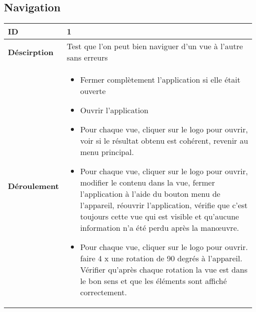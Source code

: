 	\subsection{Navigation}
				 \begin{longtable}{m{4cm}|p{10cm}|}
				 \textbf{ ID} & 1 \\
				 \hline \textbf{Déscirption} & Test que l'on peut bien naviguer d'un vue à l'autre sans erreurs\\
				 \hline \textbf{Déroulement} &
					 \begin{itemize}
						 \item Fermer complètement l'application si elle était ouverte
						 \item Ouvrir l'application
						 \item  Pour chaque vue, cliquer sur le logo pour ouvrir, voir si le résultat obtenu est cohérent, revenir au menu principal.
						 \item  Pour chaque vue, cliquer sur le logo pour ouvrir, modifier le contenu dans la vue, fermer l'application à l'aide du bouton menu de l'appareil, réouvrir l'application, vérifie que c'est toujours cette vue qui est visible et qu'aucune information n'a été perdu après la manœuvre. 
						 \item  Pour chaque vue, cliquer sur le logo pour ouvrir. faire 4 x une rotation de 90 degrés à l'appareil. Vérifier qu'après chaque rotation la vue est dans le bon sens et que les éléments sont affiché correctement. 
					 \end{itemize}
				 \\
			 \end{longtable} 
